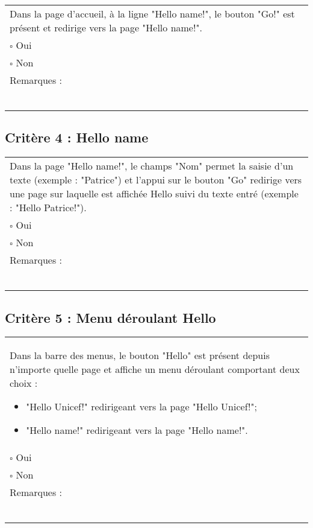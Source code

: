 	\begin{center}
    	 		\begin{tabular}[h]{|p{}|}
			\hline
				Dans la page d'accueil, à la ligne "Hello name!", le bouton "Go!" est présent et redirige vers la page "Hello name!". \\
				$\square$ Oui  \\ $\square$ Non \\\hline Remarques : \\ ~\\
			 \\\hline
     		\end{tabular}
  		\end{center}	
  		
  		
  		
  	\subsection*{Critère 4 : Hello name}
	
	\begin{center}
    	 		\begin{tabular}[h]{|p{}|}
			\hline
				Dans la page "Hello name!", le champs "Nom" permet la saisie d'un texte (exemple : "Patrice") et l'appui sur le bouton "Go" redirige vers une page sur laquelle est affichée Hello suivi du texte entré (exemple : "Hello Patrice!").  \\
				$\square$ Oui  \\ $\square$ Non \\\hline Remarques : \\ ~\\
			 \\\hline
     		\end{tabular}
  		\end{center}	
  		
  			
  	\subsection*{Critère 5 : Menu déroulant Hello}
	
	\begin{center}
    	 		\begin{tabular}[h]{|p{}|}
			\hline
				Dans la barre des menus, le bouton "Hello" est présent depuis n'importe quelle page et affiche un menu déroulant comportant deux choix : 
				\begin{itemize}
					\item "Hello Unicef!" redirigeant vers la page "Hello Unicef!";
					\item "Hello name!" redirigeant vers la page "Hello name!".
				\end{itemize}				 \\
				$\square$ Oui  \\ $\square$ Non \\\hline Remarques : \\ ~\\
			 \\\hline
     		\end{tabular}
  		\end{center}	
  		
